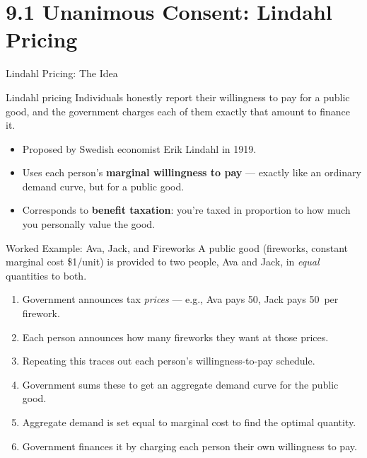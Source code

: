 \documentclass[11pt,aspectratio=169]{beamer}
\begin{document}
\section{9.1 Unanimous Consent: Lindahl Pricing}

\begin{frame}{Lindahl Pricing: The Idea}
  \begin{block}{Lindahl pricing}
    Individuals honestly report their willingness to pay for a public good, and the government charges each of them exactly that amount to finance it.
  \end{block}
  \begin{itemize}
    \item Proposed by Swedish economist Erik Lindahl in 1919.
    \item Uses each person's \textbf{marginal willingness to pay} --- exactly like an ordinary demand curve, but for a public good.
    \item Corresponds to \textbf{benefit taxation}: you're taxed in proportion to how much you personally value the good.
  \end{itemize}
\end{frame}

\begin{frame}{Worked Example: Ava, Jack, and Fireworks}
  A public good (fireworks, constant marginal cost \$1/unit) is provided to two people, Ava and Jack, in \emph{equal} quantities to both.
  \begin{enumerate}
    \setlength{\itemsep}{2pt}
    \item Government announces tax \emph{prices} --- e.g., Ava pays 50\textcent, Jack pays 50\textcent\ per firework.
    \item Each person announces how many fireworks they want at those prices.
    \item Repeating this traces out each person's willingness-to-pay schedule.
    \item Government sums these to get an aggregate demand curve for the public good.
    \item Aggregate demand is set equal to marginal cost to find the optimal quantity.
    \item Government finances it by charging each person their own willingness to pay.
  \end{enumerate}
\end{frame}
\end{document}
